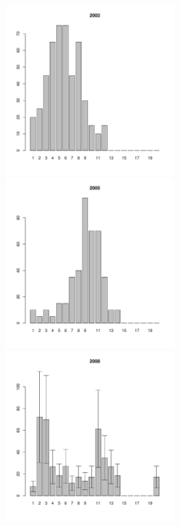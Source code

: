 \documentclass[12pt, a4paper]{article}
\begin{document}
\begin{figure}[h]
\begin{multicols}{3}
\hfill
\includegraphics[width=65mm]{../White_Sea/Luvenga_Goreliy/low_2002_.pdf}
\hfill
\includegraphics[width=65mm]{../White_Sea/Luvenga_Goreliy/low_2005_.pdf}
\hfill
\includegraphics[width=65mm]{../White_Sea/Luvenga_Goreliy/low_2008_.pdf}
\end{multicols}




\end{figure}
\end{document}

